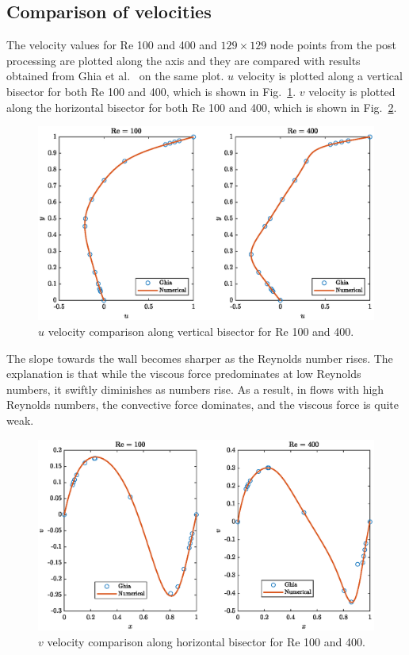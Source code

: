 \documentclass{article}
\numberwithin{equation}{section}
\numberwithin{figure}{section}
\begin{document}
\subsection{Comparison of velocities}
The velocity values for Re 100 and 400 and $129\times129$ node points from the post processing are plotted along the axis and they are compared with results obtained from Ghia et al.~\cite{ghia1982high} on the same plot. $u$ velocity is plotted along a vertical bisector  for both Re 100 and 400, which is shown in Fig.~\ref{fig:u_velocity_comp}. $v$ velocity is plotted along the horizontal bisector for both Re 100 and 400, which is shown in Fig.~\ref{fig:v_velocity_comp}.

\begin{figure}[H]
    \centering
    \includegraphics[scale=0.9,trim=50 0 55 0, clip]{u_velocity_comp.eps}
    \caption{$u$ velocity comparison along vertical bisector for Re 100 and 400.}
    \label{fig:u_velocity_comp}
\end{figure}

The slope towards the wall becomes sharper as the Reynolds number rises. The explanation is that while the viscous force predominates at low Reynolds numbers, it swiftly diminishes as numbers rise. As a result, in flows with high Reynolds numbers, the convective force dominates, and the viscous force is quite weak.



\begin{figure}[H]
    \centering
    \includegraphics[scale=0.9,trim=50 0 55 0, clip]{v_velocity_comp.eps}
    \caption{$v$ velocity comparison along horizontal bisector for Re 100 and 400.}
    \label{fig:v_velocity_comp}
\end{figure}
\end{document}
